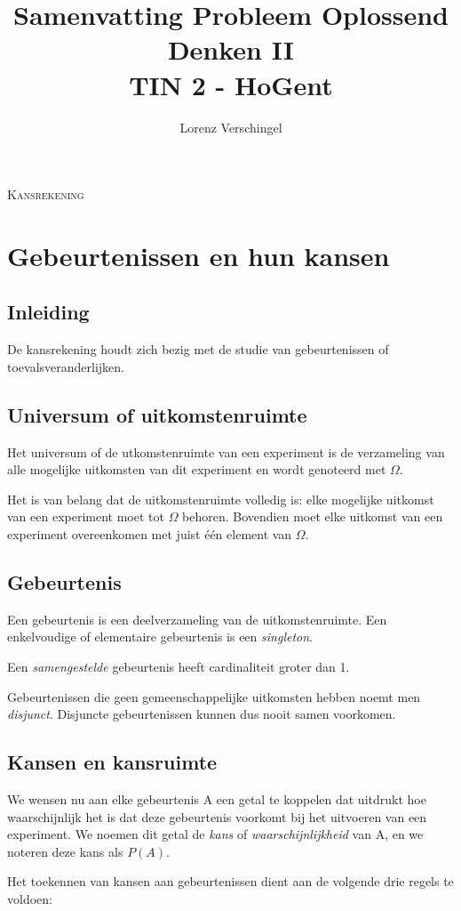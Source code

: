 \documentclass[a4paper,12pt]{article}
\title{Samenvatting Probleem Oplossend Denken II \\ \large TIN 2 - HoGent}
\author{Lorenz Verschingel}
\begin{document}
\maketitle
\LARGE \textsc{Kansrekening}\normalsize
\section{Gebeurtenissen en hun kansen}
\subsection{Inleiding}
De kansrekening houdt zich bezig met de studie van gebeurtenissen of toevalsveranderlijken.

\subsection{Universum of uitkomstenruimte}
Het universum of de utkomstenruimte van een experiment is de verzameling van alle mogelijke uitkomsten van dit experiment en wordt genoteerd met $\Omega$.

Het is van belang dat de uitkomstenruimte volledig is: elke mogelijke
uitkomst van een experiment moet tot $\Omega$ behoren.
Bovendien moet elke uitkomst van een experiment overeenkomen met juist één element van $\Omega$.

\subsection{Gebeurtenis}
Een gebeurtenis is een deelverzameling van de uitkomstenruimte.
Een enkelvoudige of elementaire gebeurtenis is een \textit{singleton}.

Een \textit{samengestelde} gebeurtenis heeft cardinaliteit groter dan 1.

Gebeurtenissen die geen gemeenschappelijke uitkomsten hebben noemt men \textit{disjunct}.
Disjuncte gebeurtenissen kunnen dus nooit samen voorkomen.

\subsection{Kansen en kansruimte}
We wensen nu aan elke gebeurtenis A een getal te koppelen dat uitdrukt hoe waarschijnlijk het is dat deze gebeurtenis voorkomt bij het uitvoeren van een experiment.
We noemen dit getal de \textit{kans} of \textit{waarschijnlijkheid} van A, en we noteren deze kans als $P(A)$.

Het toekennen van kansen aan gebeurtenissen dient aan de volgende drie regels te voldoen:
\end{document}

